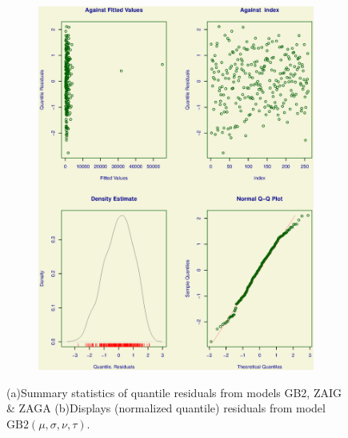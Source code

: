 \documentclass[
]{article}
\begin{document}
\begin{figure}
\begin{subfigure}[b]{0.5\textwidth}
   \includegraphics[width=1\linewidth]{ROC_4Plot_GB2.eps}
   \caption{}
   \label{Residuals_GB2}
\end{subfigure}

\caption[Normalized quantile residuals from model GB2]{(a)Summary statistics of quantile residuals from models GB2, ZAIG \& ZAGA (b)Displays (normalized quantile) residuals from model $\mbox{GB}2(\mu,\sigma,\nu,\tau)$.}
\end{figure}
\end{document}
